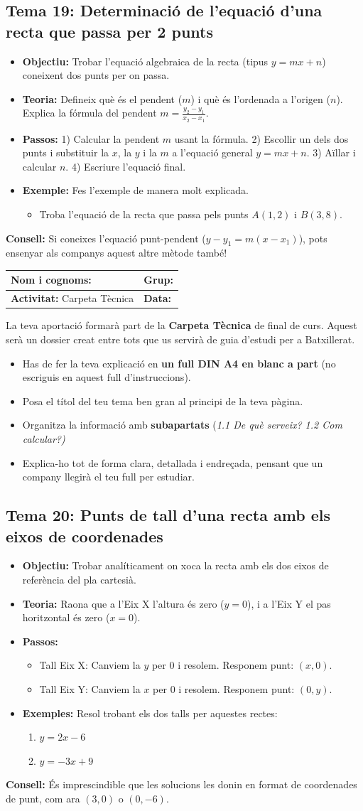 \documentclass[12pt,a4paper]{article}
\newcommand{\introcomuna}{
    \begin{tcolorbox}[colback=gray!5,colframe=gray!50!black,title=\textbf{La Carpeta Tècnica de Matemàtiques}]
    La teva aportació formarà part de la \textbf{Carpeta Tècnica} de final de curs. Aquest serà un dossier creat entre tots que us servirà de guia d'estudi per a Batxillerat.
    
    \begin{itemize}[label=\textbullet, leftmargin=*]
        \item Has de fer la teva explicació en \textbf{un full DIN A4 en blanc a part} (no escriguis en aquest full d'instruccions).
        \item Posa el títol del teu tema ben gran al principi de la teva pàgina.
        \item Organitza la informació amb \textbf{subapartats} (\textit{1.1 De què serveix? 1.2 Com calcular?)}
        \item Explica-ho tot de forma clara, detallada i endreçada, pensant que un company llegirà el teu full per estudiar.
    \end{itemize}
    \end{tcolorbox}
    \vspace{0.1cm}
}
\newcommand{\capcaleraalumne}[1]{
    \begingroup
    \renewcommand{\arraystretch}{2.2}
    \begin{tabularx}{\textwidth}{|X|p{4cm}|}
    \hline
    \textbf{Nom i cognoms:} & \textbf{Grup:} \\ \hline
    \textbf{Activitat:} Carpeta Tècnica & \textbf{Data:} \\ \hline
    \end{tabularx}
    \endgroup
    \vspace{0.4cm}
}
\begin{document}
\subsection*{Tema 19: Determinació de l'equació d'una recta que passa per 2 punts}
\begin{itemize}[label=\textbullet]
    \item \textbf{Objectiu:} Trobar l'equació algebraica de la recta (tipus $y = mx + n$) coneixent dos punts per on passa.
    \item \textbf{Teoria:} Defineix què és el pendent ($m$) i què és l'ordenada a l'origen ($n$). Explica la fórmula del pendent $m = \frac{y_2 - y_1}{x_2 - x_1}$.
    \item \textbf{Passos:} 1) Calcular la pendent $m$ usant la fórmula. 2) Escollir un dels dos punts i substituir la $x$, la $y$ i la $m$ a l'equació general $y = mx + n$. 3) Aïllar i calcular $n$. 4) Escriure l'equació final.
    \item \textbf{Exemple:} Fes l'exemple de manera molt explicada.
    \begin{itemize}
        \item Troba l'equació de la recta que passa pels punts $A(1, 2)$ i $B(3, 8)$.
    \end{itemize}
\end{itemize}
\vfill
\noindent\textbf{Consell:} Si coneixes l'equació punt-pendent ($y - y_1 = m(x - x_1)$), pots ensenyar als companys aquest altre mètode també!

\newpage
\capcaleraalumne{20}
\introcomuna
\subsection*{Tema 20: Punts de tall d'una recta amb els eixos de coordenades}
\begin{itemize}[label=\textbullet]
    \item \textbf{Objectiu:} Trobar analíticament on xoca la recta amb els dos eixos de referència del pla cartesià.
    \item \textbf{Teoria:} Raona que a l'Eix X l'altura és zero ($y=0$), i a l'Eix Y el pas horitzontal és zero ($x=0$).
    \item \textbf{Passos:} 
        \begin{itemize}
            \item Tall Eix X: Canviem la $y$ per $0$ i resolem. Responem punt: $(x, 0)$.
            \item Tall Eix Y: Canviem la $x$ per $0$ i resolem. Responem punt: $(0, y)$.
        \end{itemize}
    \item \textbf{Exemples:} Resol trobant els dos talls per aquestes rectes:
    \begin{enumerate}[label=\alph*)]
        \item $y = 2x - 6$
        \item $y = -3x + 9$
    \end{enumerate}
\end{itemize}
\vfill
\noindent\textbf{Consell:} És imprescindible que les solucions les donin en format de coordenades de punt, com ara $(3, 0)$ o $(0, -6)$.
\end{document}
